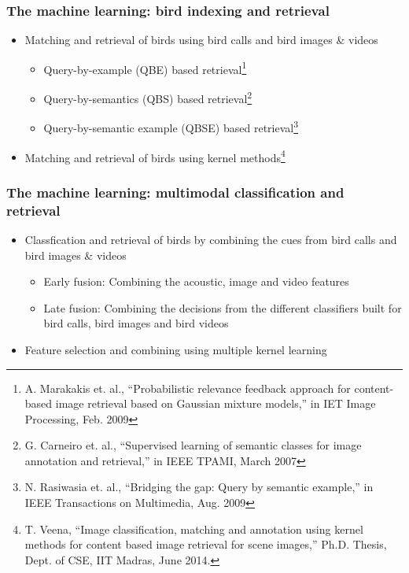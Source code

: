 \documentclass[mathserif]{beamer}
\begin{document}
\begin{frame}
\frametitle{The machine learning: bird indexing and retrieval}
\begin{itemize}
\item<2-> Matching and retrieval of birds using bird calls and bird images \& videos
\begin{itemize}
      \item Query-by-example (QBE) based retrieval\footnote{
	A. Marakakis et. al., “Probabilistic relevance feedback approach for content-based image retrieval based on Gaussian mixture models,” in IET Image Processing, Feb. 2009}
      \item Query-by-semantics (QBS) based retrieval\footnote{
	G. Carneiro et. al., “Supervised learning of semantic classes for image annotation and retrieval,” in IEEE TPAMI, March 2007}
      \item Query-by-semantic example (QBSE) based retrieval\footnote{
	N. Rasiwasia et. al., “Bridging the gap: Query by semantic example,” in IEEE Transactions on Multimedia, Aug. 2009}
\end{itemize}
\item<3-> Matching and retrieval of birds using kernel methods\footnote{
	T. Veena, “Image classification, matching and annotation using kernel methods for content based image retrieval for scene images,” Ph.D. Thesis, Dept. of CSE, IIT Madras, June 2014.}   
\end{itemize}
\end{frame}

\begin{frame}
\frametitle{The machine learning: multimodal classification and retrieval}
\begin{itemize}
\item<2-> Classfication and retrieval of birds by combining the cues from bird calls and bird images \& videos
\begin{itemize}
      \item Early fusion: Combining the acoustic, image and video features
      \item Late fusion: Combining the decisions from the different classifiers built for bird calls, bird images and bird videos
 \end{itemize}
\item<3-> Feature selection and combining using multiple kernel learning
\end{itemize}
\end{frame}
\end{document}
